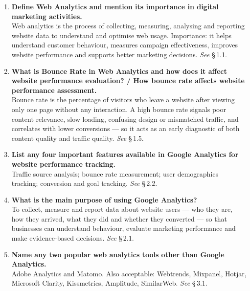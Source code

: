 \begin{enumerate}[leftmargin=2.2em,itemsep=1.1ex]

\item \textbf{Define Web Analytics and mention its importance in digital
      marketing activities.} \\
      Web analytics is the process of collecting, measuring, analysing and
      reporting website data to understand and optimise web usage. Importance: it
      helps understand customer behaviour, measures campaign effectiveness,
      improves website performance and supports better marketing decisions.
      \hfill\emph{See} \S\,1.1.

\item \textbf{What is Bounce Rate in Web Analytics and how does it affect website
      performance evaluation? / How bounce rate affects website performance
      assessment.} \\
      Bounce rate is the percentage of visitors who leave a website after viewing
      only one page without any interaction. A high bounce rate signals poor
      content relevance, slow loading, confusing design or mismatched traffic,
      and correlates with lower conversions --- so it acts as an early diagnostic
      of both content quality and traffic quality. \hfill\emph{See} \S\,1.5.

\item \textbf{List any four important features available in Google Analytics for
      website performance tracking.} \\
      Traffic source analysis; bounce rate measurement; user demographics
      tracking; conversion and goal tracking. \hfill\emph{See} \S\,2.2.

\item \textbf{What is the main purpose of using Google Analytics?}
      \\
      To collect, measure and report data about website users --- who they are,
      how they arrived, what they did and whether they converted --- so that
      businesses can understand behaviour, evaluate marketing performance and
      make evidence-based decisions. \hfill\emph{See} \S\,2.1.

\item \textbf{Name any two popular web analytics tools other than Google
      Analytics.} \\
      Adobe Analytics and Matomo. Also acceptable: Webtrends, Mixpanel, Hotjar,
      Microsoft Clarity, Kissmetrics, Amplitude, SimilarWeb.
      \hfill\emph{See} \S\,3.1.


\end{enumerate}
